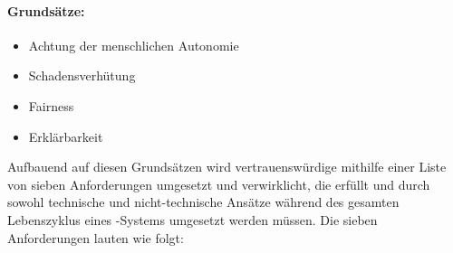\documentclass[hidelinks,12pt]{report}
\begin{document}
\paragraph{Grundsätze:}
\begin{itemize}
	\item  Achtung der menschlichen Autonomie
	\item  Schadensverhütung
	\item  Fairness
	\item  Erklärbarkeit
\end{itemize}
Aufbauend auf diesen Grundsätzen wird vertrauenswürdige  mithilfe einer Liste von sieben Anforderungen umgesetzt und verwirklicht, die erfüllt und durch sowohl technische und nicht-technische Ansätze während des gesamten Lebenszyklus eines -Systems umgesetzt werden müssen. Die sieben Anforderungen lauten wie folgt:
\end{document}
